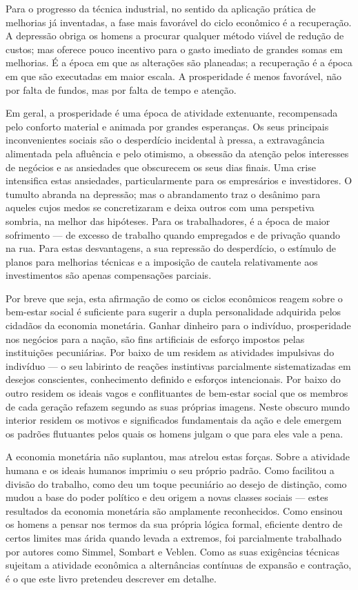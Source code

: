 \documentclass[12pt]{article}
\begin{document}
Para o progresso da técnica industrial, no sentido da aplicação prática de melhorias já inventadas, a fase mais favorável do ciclo econômico é a recuperação. A depressão obriga os homens a procurar qualquer método viável de redução de custos; mas oferece pouco incentivo para o gasto imediato de grandes somas em melhorias. É a época em que as alterações são planeadas; a recuperação é a época em que são executadas em maior escala. A prosperidade é menos favorável, não por falta de fundos, mas por falta de tempo e atenção.

Em geral, a prosperidade é uma época de atividade extenuante, recompensada pelo conforto material e animada por grandes esperanças. Os seus principais inconvenientes sociais são o desperdício incidental à pressa, a extravagância alimentada pela afluência e pelo otimismo, a obsessão da atenção pelos interesses de negócios e as ansiedades que obscurecem os seus dias finais. Uma crise intensifica estas ansiedades, particularmente para os empresários e investidores. O tumulto abranda na depressão; mas o abrandamento traz o desânimo para aqueles cujos medos se concretizaram e deixa outros com uma perspetiva sombria, na melhor das hipóteses. Para os trabalhadores, é a época de maior sofrimento — de excesso de trabalho quando empregados e de privação quando na rua. Para estas desvantagens, a sua repressão do desperdício, o estímulo de planos para melhorias técnicas e a imposição de cautela relativamente aos investimentos são apenas compensações parciais.

Por breve que seja, esta afirmação de como os ciclos econômicos reagem sobre o bem-estar social é suficiente para sugerir a dupla personalidade adquirida pelos cidadãos da economia monetária. Ganhar dinheiro para o indivíduo, prosperidade nos negócios para a nação, são fins artificiais de esforço impostos pelas instituições pecuniárias. Por baixo de um residem as atividades impulsivas do indivíduo — o seu labirinto de reações instintivas parcialmente sistematizadas em desejos conscientes, conhecimento definido e esforços intencionais. Por baixo do outro residem os ideais vagos e conflituantes de bem-estar social que os membros de cada geração refazem segundo as suas próprias imagens. Neste obscuro mundo interior residem os motivos e significados fundamentais da ação e dele emergem os padrões flutuantes pelos quais os homens julgam o que para eles vale a pena.

A economia monetária não suplantou, mas atrelou estas forças. Sobre a atividade humana e os ideais humanos imprimiu o seu próprio padrão. Como facilitou a divisão do trabalho, como deu um toque pecuniário ao desejo de distinção, como mudou a base do poder político e deu origem a novas classes sociais — estes resultados da economia monetária são amplamente reconhecidos. Como ensinou os homens a pensar nos termos da sua própria lógica formal, eficiente dentro de certos limites mas árida quando levada a extremos, foi parcialmente trabalhado por autores como Simmel, Sombart e Veblen. Como as suas exigências técnicas sujeitam a atividade econômica a alternâncias contínuas de expansão e contração, é o que este livro pretendeu descrever em detalhe.
\end{document}
